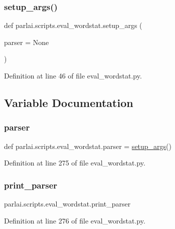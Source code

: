 \subsubsection{\texorpdfstring{setup\+\_\+args()}{setup\_args()}}
{\footnotesize\ttfamily def parlai.\+scripts.\+eval\+\_\+wordstat.\+setup\+\_\+args (\begin{DoxyParamCaption}\item[{}]{parser = {\ttfamily None} }\end{DoxyParamCaption})}



Definition at line 46 of file eval\+\_\+wordstat.\+py.



\subsection{Variable Documentation}
\mbox{\label{namespaceparlai_1_1scripts_1_1eval__wordstat_a78304b921cd79a0fe7c659ed87bad685}} 
\subsubsection{\texorpdfstring{parser}{parser}}
{\footnotesize\ttfamily def parlai.\+scripts.\+eval\+\_\+wordstat.\+parser = \hyperlink{namespaceparlai_1_1scripts_1_1eval__wordstat_af41cd95533433b93e7383bc6dab04963}{setup\+\_\+args}()}



Definition at line 275 of file eval\+\_\+wordstat.\+py.

\mbox{\label{namespaceparlai_1_1scripts_1_1eval__wordstat_a3425702146738eb147346873ecda1983}} 
\subsubsection{\texorpdfstring{print\+\_\+parser}{print\_parser}}
{\footnotesize\ttfamily parlai.\+scripts.\+eval\+\_\+wordstat.\+print\+\_\+parser}



Definition at line 276 of file eval\+\_\+wordstat.\+py.

